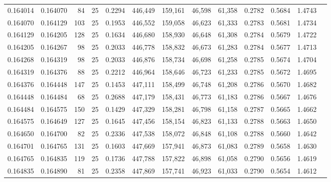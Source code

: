 \begin{tabular}{rrrrrrrrrrrrr}
0.164014 & 0.164070 &    84 &  25 &                                     0.2294 & 446,449 & 159,161 &  46,598 &  61,358 & 0.2782 & 0.5684 & 1.4743 \\
0.164070 & 0.164129 &   103 &  25 &                                     0.1953 & 446,552 & 159,058 &  46,623 &  61,333 & 0.2783 & 0.5681 & 1.4734 \\
0.164129 & 0.164205 &   128 &  25 &                                     0.1634 & 446,680 & 158,930 &  46,648 &  61,308 & 0.2784 & 0.5679 & 1.4722 \\
0.164205 & 0.164267 &    98 &  25 &                                     0.2033 & 446,778 & 158,832 &  46,673 &  61,283 & 0.2784 & 0.5677 & 1.4713 \\
0.164268 & 0.164319 &    98 &  25 &                                     0.2033 & 446,876 & 158,734 &  46,698 &  61,258 & 0.2785 & 0.5674 & 1.4704 \\
0.164319 & 0.164376 &    88 &  25 &                                     0.2212 & 446,964 & 158,646 &  46,723 &  61,233 & 0.2785 & 0.5672 & 1.4695 \\
0.164376 & 0.164448 &   147 &  25 &                                     0.1453 & 447,111 & 158,499 &  46,748 &  61,208 & 0.2786 & 0.5670 & 1.4682 \\
0.164448 & 0.164484 &    68 &  25 &                                     0.2688 & 447,179 & 158,431 &  46,773 &  61,183 & 0.2786 & 0.5667 & 1.4676 \\
0.164484 & 0.164575 &   150 &  25 &                                     0.1429 & 447,329 & 158,281 &  46,798 &  61,158 & 0.2787 & 0.5665 & 1.4662 \\
0.164575 & 0.164649 &   127 &  25 &                                     0.1645 & 447,456 & 158,154 &  46,823 &  61,133 & 0.2788 & 0.5663 & 1.4650 \\
0.164650 & 0.164700 &    82 &  25 &                                     0.2336 & 447,538 & 158,072 &  46,848 &  61,108 & 0.2788 & 0.5660 & 1.4642 \\
0.164701 & 0.164765 &   131 &  25 &                                     0.1603 & 447,669 & 157,941 &  46,873 &  61,083 & 0.2789 & 0.5658 & 1.4630 \\
0.164765 & 0.164835 &   119 &  25 &                                     0.1736 & 447,788 & 157,822 &  46,898 &  61,058 & 0.2790 & 0.5656 & 1.4619 \\
0.164835 & 0.164890 &    81 &  25 &                                     0.2358 & 447,869 & 157,741 &  46,923 &  61,033 & 0.2790 & 0.5654 & 1.4612 \\

\end{tabular}
